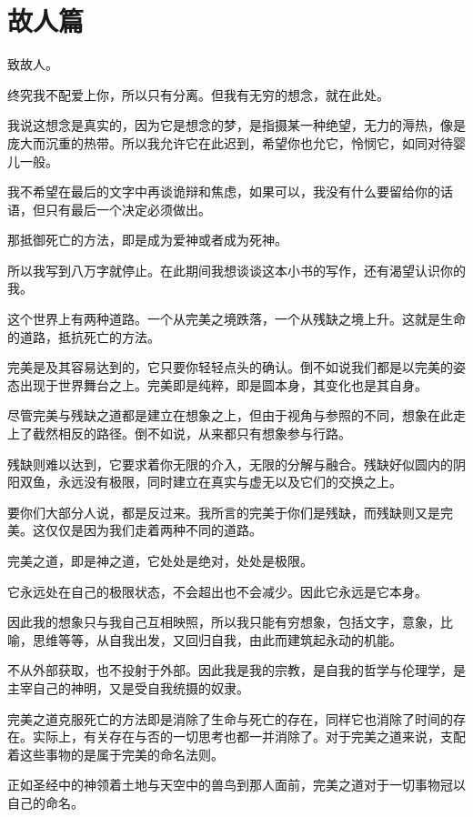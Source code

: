 \documentclass[UTF8]{article}
\begin{document}
\section{故人篇}
\par 致故人。
\par 终究我不配爱上你，所以只有分离。但我有无穷的想念，就在此处。
\par 我说这想念是真实的，因为它是想念的梦，是指摄某一种绝望，无力的溽热，像是庞大而沉重的热带。所以我允许它在此迟到，希望你也允它，怜悯它，如同对待婴儿一般。
\par 我不希望在最后的文字中再谈诡辩和焦虑，如果可以，我没有什么要留给你的话语，但只有最后一个决定必须做出。
\par 那抵御死亡的方法，即是成为爱神或者成为死神。
\par 所以我写到八万字就停止。在此期间我想谈谈这本小书的写作，还有渴望认识你的我。
\\[0.6cm]
\par 这个世界上有两种道路。一个从完美之境跌落，一个从残缺之境上升。这就是生命的道路，抵抗死亡的方法。
\par 完美是及其容易达到的，它只要你轻轻点头的确认。倒不如说我们都是以完美的姿态出现于世界舞台之上。完美即是纯粹，即是圆本身，其变化也是其自身。
\par 尽管完美与残缺之道都是建立在想象之上，但由于视角与参照的不同，想象在此走上了截然相反的路径。倒不如说，从来都只有想象参与行路。
\par 残缺则难以达到，它要求着你无限的介入，无限的分解与融合。残缺好似圆内的阴阳双鱼，永远没有极限，同时建立在真实与虚无以及它们的交换之上。
\par 要你们大部分人说，都是反过来。我所言的完美于你们是残缺，而残缺则又是完美。这仅仅是因为我们走着两种不同的道路。
\\[0.6cm]
\par 完美之道，即是神之道，它处处是绝对，处处是极限。
\par 它永远处在自己的极限状态，不会超出也不会减少。因此它永远是它本身。
\par 因此我的想象只与我自己互相映照，所以我只能有穷想象，包括文字，意象，比喻，思维等等，从自我出发，又回归自我，由此而建筑起永动的机能。
\par 不从外部获取，也不投射于外部。因此我是我的宗教，是自我的哲学与伦理学，是主宰自己的神明，又是受自我统摄的奴隶。
\par 完美之道克服死亡的方法即是消除了生命与死亡的存在，同样它也消除了时间的存在。实际上，有关存在与否的一切思考也都一并消除了。对于完美之道来说，支配着这些事物的是属于完美的命名法则。
\par 正如圣经中的神领着土地与天空中的兽鸟到那人面前，完美之道对于一切事物冠以自己的命名。
\end{document}
